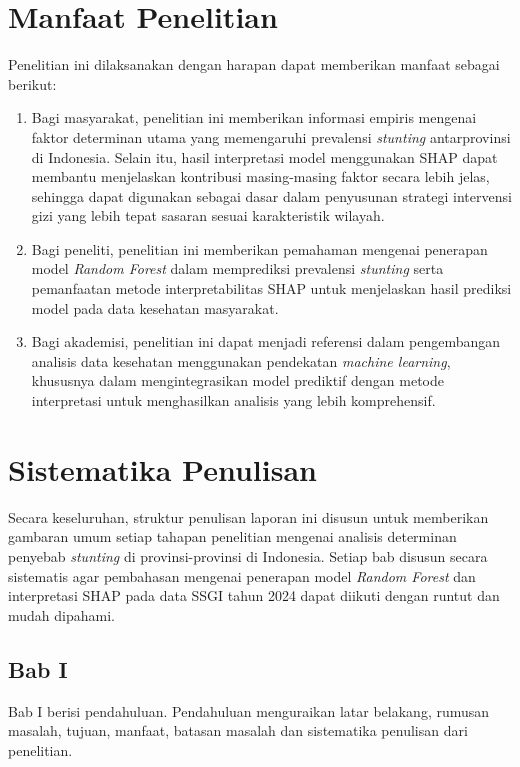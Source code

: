 \section{Manfaat Penelitian}
Penelitian ini dilaksanakan dengan harapan dapat memberikan manfaat sebagai berikut:

\begin{enumerate}
    \item Bagi masyarakat, penelitian ini memberikan informasi empiris mengenai faktor determinan utama yang memengaruhi prevalensi \textit{stunting} antarprovinsi di Indonesia. Selain itu, hasil interpretasi model menggunakan SHAP dapat membantu menjelaskan kontribusi masing-masing faktor secara lebih jelas, sehingga dapat digunakan sebagai dasar dalam penyusunan strategi intervensi gizi yang lebih tepat sasaran sesuai karakteristik wilayah.
    \item Bagi peneliti, penelitian ini memberikan pemahaman mengenai penerapan model \textit{Random Forest} dalam memprediksi prevalensi \textit{stunting} serta pemanfaatan metode interpretabilitas SHAP untuk menjelaskan hasil prediksi model pada data kesehatan masyarakat.
    \item Bagi akademisi, penelitian ini dapat menjadi referensi dalam pengembangan analisis data kesehatan menggunakan pendekatan \textit{machine learning}, khususnya dalam mengintegrasikan model prediktif dengan metode interpretasi untuk menghasilkan analisis yang lebih komprehensif.
\end{enumerate}

\section{Sistematika Penulisan} \label{I.Sistematika}
Secara keseluruhan, struktur penulisan laporan ini disusun untuk memberikan gambaran umum setiap tahapan penelitian mengenai analisis determinan penyebab \textit{stunting} di provinsi-provinsi di Indonesia. Setiap bab disusun secara sistematis agar pembahasan mengenai penerapan model \textit{Random Forest} dan interpretasi SHAP pada data SSGI tahun 2024 dapat diikuti dengan runtut dan mudah dipahami.

\subsection*{Bab I}
Bab I berisi pendahuluan. Pendahuluan menguraikan latar belakang, rumusan masalah, tujuan, manfaat, batasan masalah dan sistematika penulisan dari penelitian.

